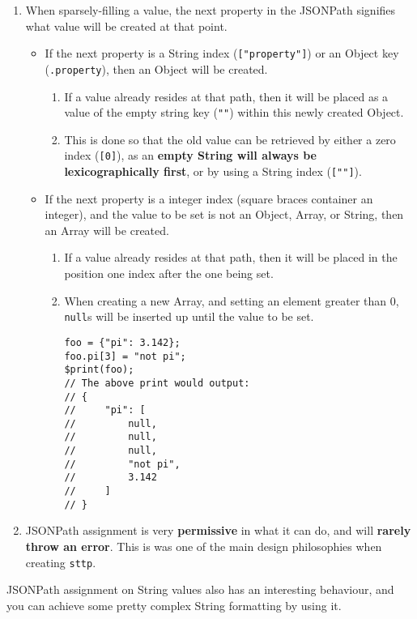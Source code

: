 \begin{enumerate}
    \item When sparsely-filling a value, the next property in the JSONPath signifies what value will be created at that point.
    \begin{itemize}
        \item If the next property is a String index (\verb|["property"]|) or an Object key (\verb|.property|), then an Object will be created.
        \begin{enumerate}
            \item If a value already resides at that path, then it will be placed as a value of the empty string key (\verb|""|) within this newly created Object.
            \item This is done so that the old value can be retrieved by either a zero index (\verb|[0]|), as an \textbf{empty String will always be lexicographically first}, or by using a String index (\verb|[""]|).
        \end{enumerate}
        \item If the next property is a integer index (square braces container an integer), and the value to be set is not an Object, Array, or String, then an Array will be created.
        \begin{enumerate}
            \item If a value already resides at that path, then it will be placed in the position one index after the one being set.
            \item When creating a new Array, and setting an element greater than 0, \verb|null|s will be inserted up until the value to be set.
            \begin{verbatim}
foo = {"pi": 3.142};
foo.pi[3] = "not pi";
$print(foo);
// The above print would output:
// {
//     "pi": [
//         null,
//         null,
//         null,
//         "not pi",
//         3.142
//     ]
// }
            \end{verbatim}
        \end{enumerate}
    \end{itemize}
    \item JSONPath assignment is very \textbf{permissive} in what it can do, and will \textbf{rarely throw an error}. This is was one of the main design philosophies when creating \verb|sttp|.
\end{enumerate}

JSONPath assignment on String values also has an interesting behaviour, and you can achieve some pretty complex String formatting by using it.

